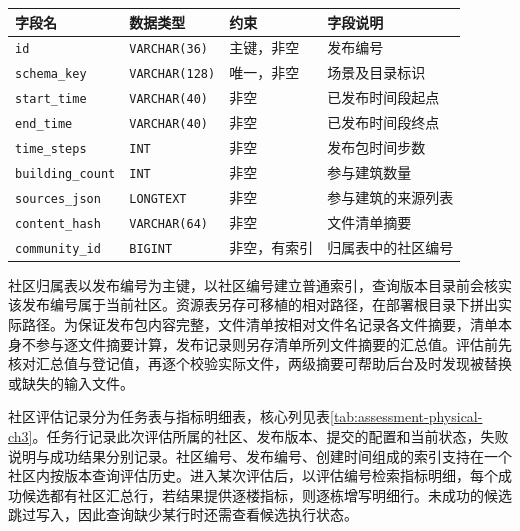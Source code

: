 \begin{table}[!htbp]
    \centering\small
    \label{tab:release-physical-ch3}
    \begin{tabular}{@{}P{9em}P{7em}P{6em}P{8em}@{}}
        \toprule
        字段名                      & 数据类型                  & 约束     & 字段说明      \\ \midrule
        \texttt{id}              & \texttt{VARCHAR(36)}  & 主键，非空  & 发布编号      \\
        \texttt{schema\_key}     & \texttt{VARCHAR(128)} & 唯一，非空  & 场景及目录标识   \\
        \texttt{start\_time}     & \texttt{VARCHAR(40)}  & 非空     & 已发布时间段起点  \\
        \texttt{end\_time}       & \texttt{VARCHAR(40)}  & 非空     & 已发布时间段终点  \\
        \texttt{time\_steps}     & \texttt{INT}          & 非空     & 发布包时间步数   \\
        \texttt{building\_count} & \texttt{INT}          & 非空     & 参与建筑数量    \\
        \texttt{sources\_json}   & \texttt{LONGTEXT}     & 非空     & 参与建筑的来源列表 \\
        \texttt{content\_hash}   & \texttt{VARCHAR(64)}  & 非空     & 文件清单摘要    \\
        \texttt{community\_id}   & \texttt{BIGINT}       & 非空，有索引 & 归属表中的社区编号 \\
        \bottomrule
    \end{tabular}
\end{table}

社区归属表以发布编号为主键，以社区编号建立普通索引，查询版本目录前会核实该发布编号属于当前社区。资源表另存可移植的相对路径，在部署根目录下拼出实际路径。为保证发布包内容完整，文件清单按相对文件名记录各文件摘要，清单本身不参与逐文件摘要计算，发布记录则另存清单所列文件摘要的汇总值。评估前先核对汇总值与登记值，再逐个校验实际文件，两级摘要可帮助后台及时发现被替换或缺失的输入文件。

社区评估记录分为任务表与指标明细表，核心列见表\ref{tab:assessment-physical-ch3}。任务行记录此次评估所属的社区、发布版本、提交的配置和当前状态，失败说明与成功结果分别记录。社区编号、发布编号、创建时间组成的索引支持在一个社区内按版本查询评估历史。进入某次评估后，以评估编号检索指标明细，每个成功候选都有社区汇总行，若结果提供逐楼指标，则逐栋增写明细行。未成功的候选跳过写入，因此查询缺少某行时还需查看候选执行状态。

